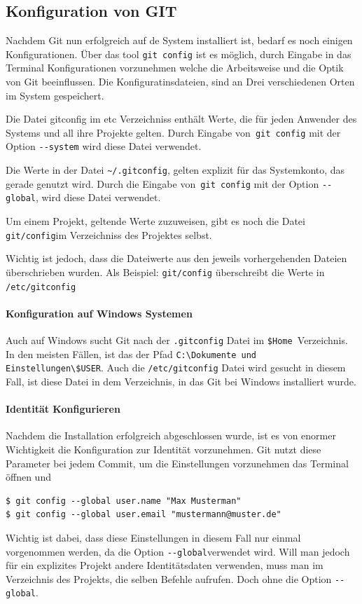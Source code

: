 \documentclass[12pt,a4paper,bibliography=totocnumbered,listof=totocnumbered]{scrartcl}
\begin{document}
\subsection{Konfiguration von GIT}
Nachdem Git nun erfolgreich auf de System installiert ist, bedarf es noch einigen Konfigurationen. Über das tool \lstinline|git config| ist es möglich, durch Eingabe in das Terminal Konfigurationen vorzunehmen welche die Arbeitsweise und die Optik von Git beeinflussen. Die Konfiguratinsdateien, sind an Drei verschiedenen Orten im System
gespeichert. 
\begin{compactitem}
	\item Die Datei gitconfig im etc Verzeichniss enthält Werte, die für jeden Anwender des Systems und all ihre Projekte gelten. Durch Eingabe von\lstinline| git config| mit der Option \lstinline|--system| wird diese Datei verwendet.
\item Die Werte in der Datei \lstinline|~/.gitconfig|, gelten explizit für das Systemkonto, das gerade genutzt wird. Durch die Eingabe von\lstinline| git config| mit der Option \lstinline|--global|, wird diese Datei verwendet. 
\item Um einem Projekt, geltende Werte zuzuweisen, gibt es noch die Datei \lstinline|git/config|im Verzeichniss des Projektes selbst. 
\end{compactitem}
Wichtig ist jedoch, dass die Dateiwerte aus den jeweils vorhergehenden Dateien überschrieben wurden. Als Beispiel: \lstinline|git/config| überschreibt die Werte in \lstinline|/etc/gitconfig|

\paragraph{Konfiguration auf Windows Systemen}
Auch auf Windows sucht Git nach der \lstinline|.gitconfig| Datei im  \lstinline|$Home |Verzeichnis.  In den meisten Fällen, ist das 
der Pfad \lstinline|C:\Dokumente und Einstellungen\$USER|. Auch die \lstinline|/etc/gitconfig| Datei wird gesucht in diesem Fall, ist diese Datei in dem Verzeichnis, in das Git bei Windows installiert wurde.

\paragraph{Identität Konfigurieren}
Nachdem die Installation erfolgreich abgeschlossen wurde, ist es von enormer Wichtigkeit die Konfiguration zur Identität vorzunehmen. Git nutzt diese Parameter bei jedem Commit,
um die Einstellungen vorzunehmen das Terminal öffnen und
\begin{lstlisting}
$ git config --global user.name "Max Musterman"
$ git config --global user.email "mustermann@muster.de"
 \end{lstlisting}
Wichtig ist dabei, dass diese Einstellungen in diesem Fall nur einmal vorgenommen werden, da die Option \lstinline|--global|verwendet wird. Will man jedoch für ein explizites Projekt andere Identitätsdaten verwenden, muss man im Verzeichnis des Projekts, die selben Befehle aufrufen. Doch ohne die Option \lstinline|--global|.
\end{document}
